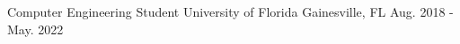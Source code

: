 \begin{cventries}
  \cventry
    {Computer Engineering Student}
    {University of Florida}
    {Gainesville, FL}
    {Aug. 2018 - May. 2022}
    {}
\end{cventries}

